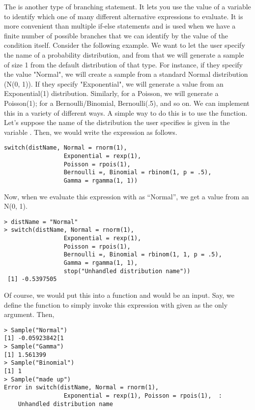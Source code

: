 The  is another type of branching statement. It lets
you use the value of a variable to identify which one of many
different alternative expressions to evaluate. It is more convenient
than multiple if-else statements and is used when we have a finite
number of possible branches that we can identify by the value of the
condition itself. Consider the following example. We want to let the
user specify the name of a probability distribution, and from that we
will generate a sample of size 1 from the default distribution of that
type. For instance, if they specify the value "Normal", we will create
a sample from a standard Normal distribution (N(0, 1)). If they
specify "Exponential", we will generate a value from an Exponential(1)
distribution. Similarly, for a Poisson, we will generate a Poisson(1);
for a Bernoulli/Binomial, Bernoulli(.5), and so on. We can implement
this in a variety of different ways.  A simple way to do this is to
use the  function. Let's suppose the name of the
distribution the user specifies is given in the variable
. Then, we would write the expression as follows.
\begin{verbatim}
switch(distName, Normal = rnorm(1),
                 Exponential = rexp(1),
                 Poisson = rpois(1),
                 Bernoulli =, Binomial = rbinom(1, p = .5),
                 Gamma = rgamma(1, 1))
\end{verbatim}
Now, when we evaluate this expression with  as
``Normal'', we get a value from an N(0, 1).
\begin{verbatim}
> distName = "Normal"
> switch(distName, Normal = rnorm(1),
                 Exponential = rexp(1),
                 Poisson = rpois(1),
                 Bernoulli =, Binomial = rbinom(1, 1, p = .5),
                 Gamma = rgamma(1, 1),
                 stop("Unhandled distribution name"))
 [1] -0.5397505
\end{verbatim}
Of course, we would put this into a function and 
would be an input. Say, we define the function  to
simply invoke this expression with  given as the
only argument. Then,
\begin{verbatim}
> Sample("Normal")
[1] -0.05923842[1
> Sample("Gamma")
[1] 1.561399
> Sample("Binomial")
[1] 1
> Sample("made up")
Error in switch(distName, Normal = rnorm(1),
                 Exponential = rexp(1), Poisson = rpois(1),  : 
	Unhandled distribution name
\end{verbatim}


